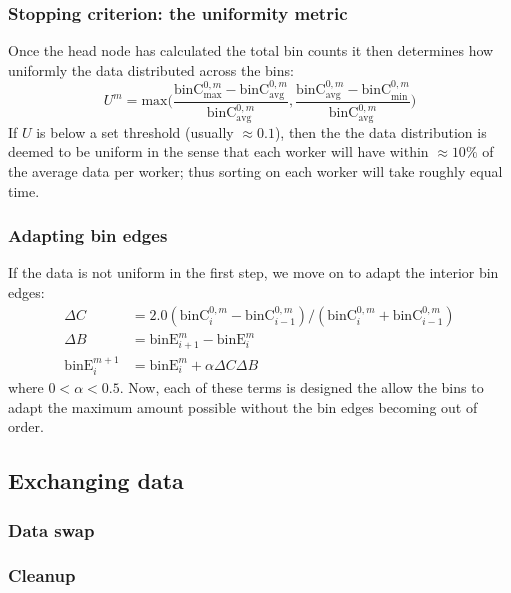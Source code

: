 \documentclass{article}
\begin{document}
\subsubsection{Stopping criterion: the uniformity metric}
Once the head node has calculated the total bin counts it then determines how uniformly the data distributed across the bins:
\begin{equation}
	U^m = \textrm{max} \bigg( \dfrac{\textrm{binC}^{0,m}_{\textrm{max}} - \textrm{binC}^{0,m}_{\textrm{avg}}}{\textrm{binC}^{0,m}_{\textrm{avg}}}, \dfrac{\textrm{binC}^{0,m}_{\textrm{avg}} - \textrm{binC}^{0,m}_{\textrm{min}}}{\textrm{binC}^{0,m}_{\textrm{avg}}} \bigg)
\end{equation}
If $U$ is below a set threshold (usually $\approx 0.1$), then the the data distribution is deemed to be uniform in the sense that each worker will have within $\approx 10\%$ of the average data per worker; thus sorting on each worker will take roughly equal time.


\subsubsection{Adapting bin edges}
If the data is not uniform in the first step, we move on to adapt the interior bin edges:	\begin{equation}
	\begin{split}
		\Delta C & = 2.0 ( \textrm{binC}^{0,m}_i - \textrm{binC}^{0,m}_{i-1} ) / ( \textrm{binC}^{0,m}_i + \textrm{binC}^{0,m}_{i-1} ) \\
		\Delta B & = \textrm{binE}^m_{i+1} - \textrm{binE}^m_i \\
		\textrm{binE}^{m+1}_i & = \textrm{binE}^m_i + \alpha \Delta C \Delta B
	\end{split}
\end{equation}
where $0 < \alpha < 0.5$. Now, each of these terms is designed the allow the bins to adapt the maximum amount possible without the bin edges becoming out of order.







\subsection{Exchanging data}
\subsubsection{Data swap}
\subsubsection{Cleanup}
\end{document}
